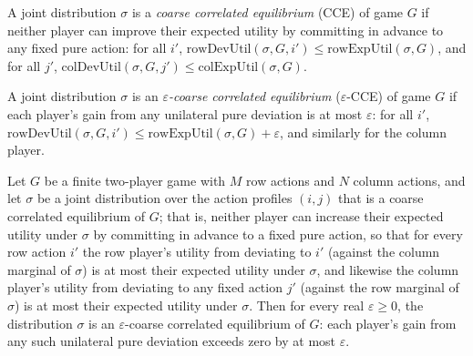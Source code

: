 \begin{definition}
\label{IsCoarseCorrelatedEquilibrium}
\leanok
{}
A joint distribution $\sigma$ is a \emph{coarse correlated equilibrium} (CCE)
of game $G$ if neither player can improve their expected utility by committing
in advance to any fixed pure action: for all $i'$,
$\mathrm{rowDevUtil}(\sigma, G, i') \le \mathrm{rowExpUtil}(\sigma, G)$, and
for all $j'$, $\mathrm{colDevUtil}(\sigma, G, j') \le \mathrm{colExpUtil}(\sigma, G)$.
\end{definition}

\begin{definition}
\label{IsApproxCoarseCorrelatedEquilibrium}
\leanok
{}
A joint distribution $\sigma$ is an \emph{$\varepsilon$-coarse correlated
equilibrium} ($\varepsilon$-CCE) of game $G$ if each player's gain from any
unilateral pure deviation is at most $\varepsilon$: for all $i'$,
$\mathrm{rowDevUtil}(\sigma, G, i') \le \mathrm{rowExpUtil}(\sigma, G) + \varepsilon$,
and similarly for the column player.
\end{definition}

\begin{lemma}
\label{IsCoarseCorrelatedEquilibrium.toApprox}
\leanok
{}
Let $G$ be a finite two-player game with $M$ row actions and $N$ column actions, and let
$\sigma$ be a joint distribution over the action profiles $(i,j)$ that is a coarse
correlated equilibrium of $G$; that is, neither player can increase their expected
utility under $\sigma$ by committing in advance to a fixed pure action, so that for
every row action $i'$ the row player's utility from deviating to $i'$ (against the
column marginal of $\sigma$) is at most their expected utility under $\sigma$, and
likewise the column player's utility from deviating to any fixed action $j'$ (against
the row marginal of $\sigma$) is at most their expected utility under $\sigma$. Then for
every real $\varepsilon \ge 0$, the distribution $\sigma$ is an $\varepsilon$-coarse
correlated equilibrium of $G$: each player's gain from any such unilateral pure
deviation exceeds zero by at most $\varepsilon$.
\end{lemma}


